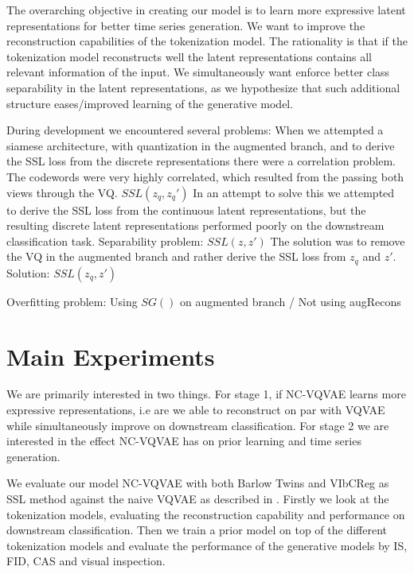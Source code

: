 \documentclass[../../thesis.tex]{subfiles}
\begin{document}
The overarching objective in creating our model is to learn more expressive latent representations for better time series generation. We want to improve the reconstruction capabilities of the tokenization model. The rationality is that if the tokenization model reconstructs well the latent representations contains all relevant information of the input. We simultaneously want enforce better class separability in the latent representations, as we hypothesize that such additional structure eases/improved learning of the generative model.\newline

During development we encountered several problems:\newline
When we attempted a siamese architecture, with quantization in the augmented branch, and to derive the SSL loss from the discrete representations there were a correlation problem. The codewords were very highly correlated, which resulted from the passing both views through the VQ.  $SSL(z_q,z_q')$ \newline
In an attempt to solve this we attempted to derive the SSL loss from the continuous latent representations, but the resulting discrete latent representations performed poorly on the downstream classification task. Separability problem: $SSL(z,z')$ \newline
The solution was to remove the VQ in the augmented branch and rather derive the SSL loss from $z_q$ and $z'$. Solution: $SSL(z_q,z')$ \newline

Overfitting problem: Using $SG()$ on augmented branch / Not using augRecons \newline

\section{Main Experiments}

We are primarily interested in two things. For stage 1, if NC-VQVAE learns more expressive representations, i.e are we able to reconstruct on par with VQVAE while simultaneously improve on downstream classification. For stage 2 we are interested in the effect NC-VQVAE has on prior learning and time series generation. \newline

We evaluate our model NC-VQVAE with both Barlow Twins and VIbCReg as SSL method against the naive VQVAE as described in \cite{TimeVQVAE}. Firstly we look at the tokenization models, evaluating the reconstruction capability and performance on downstream classification. Then we train a prior model on top of the different tokenization models and evaluate the performance of the generative models by IS, FID, CAS and visual inspection.\newline
\end{document}
